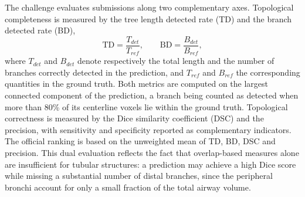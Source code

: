 The challenge evaluates submissions along two complementary axes. Topological
completeness is measured by the tree length detected rate (TD) and the branch
detected rate (BD),
\begin{equation}                 %
  \mathrm{TD} = \frac{T_{det}}{T_{ref}},
  \qquad
  \mathrm{BD} = \frac{B_{det}}{B_{ref}},
  \label{eq:td_bd}
\end{equation}
where $T_{det}$ and $B_{det}$ denote respectively the total length and the
number of branches correctly detected in the prediction, and $T_{ref}$ and
$B_{ref}$ the corresponding quantities in the ground truth. Both metrics are
computed on the largest connected component of the prediction, a branch being
counted as detected when more than 80\% of its centerline voxels lie within the
ground truth. Topological correctness is measured by the Dice similarity
coefficient (DSC) and the precision, with sensitivity and specificity reported
as complementary indicators. The official ranking is based on the unweighted
mean of TD, BD, DSC and precision. This dual evaluation reflects the fact that
overlap-based measures alone are insufficient for tubular structures: a
prediction may achieve a high Dice score while missing a substantial number of
distal branches, since the peripheral bronchi account for only a small fraction
of the total airway volume.

